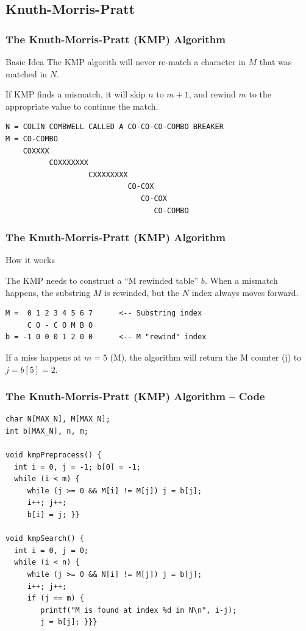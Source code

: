 \subsection{Knuth-Morris-Pratt}
\begin{frame}[fragile]
  \frametitle{The Knuth-Morris-Pratt (KMP) Algorithm}

  \begin{block}{Basic Idea}
    The KMP algorith will never re-match a character in $M$ that was
    matched in $N$.

    \bigskip

    If KMP finds a mismatch, it will skip $n$ to $m+1$, and rewind $m$ to the
    appropriate value to continue the match.
  \end{block}

\begin{verbatim}
N = COLIN COMBWELL CALLED A CO-CO-CO-COMBO BREAKER
M = CO-COMBO
    COXXXX
          COXXXXXXX
                   CXXXXXXXX
                            CO-COX
                               CO-COX
                                  CO-COMBO
\end{verbatim}
\end{frame}


\begin{frame}[fragile]
  \frametitle{The Knuth-Morris-Pratt (KMP) Algorithm}
    \begin{block}{How it works}

      The KMP needs to construct a ``M rewinded table'' $b$. When a mismatch happens, the substring $M$ is rewinded, but the $N$ index always moves forward.

\begin{verbatim}
M =  0 1 2 3 4 5 6 7      <-- Substring index
     C O - C O M B O
b = -1 0 0 0 1 2 0 0      <-- M "rewind" index
\end{verbatim}

If a miss happens at $m=5$ (M), the algorithm will return the M counter (j)
to $j = b[5] = 2$.
    \end{block}
\end{frame}

\begin{frame}[fragile]
  \frametitle{The Knuth-Morris-Pratt (KMP) Algorithm -- Code}
  {\smaller
  \begin{exampleblock}{}
\begin{verbatim}
char N[MAX_N], M[MAX_N];
int b[MAX_N], n, m;

void kmpPreprocess() {
  int i = 0, j = -1; b[0] = -1;
  while (i < m) {
     while (j >= 0 && M[i] != M[j]) j = b[j];
     i++; j++;
     b[i] = j; }}

void kmpSearch() {
  int i = 0, j = 0;
  while (i < n) {
     while (j >= 0 && N[i] != M[j]) j = b[j];
     i++; j++;
     if (j == m) {
        printf("M is found at index %d in N\n", i-j);
        j = b[j]; }}}
\end{verbatim}
  \end{exampleblock}
  }
\end{frame}

